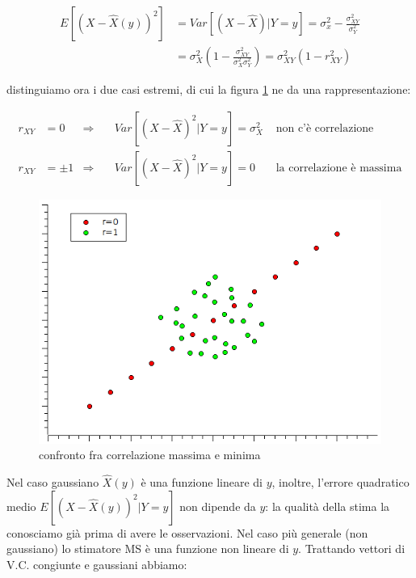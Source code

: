   \[ 
    \begin{split}
    E\left[(X-\hat{X}(y))^2\right] & =Var[(X-\hat{X})|Y=y]=\sigma_x^2-\frac{\sigma_{XY}^2}{\sigma_Y^2}\\
    & =\sigma_X^2(1-\frac{\sigma_{XY}^2}{\sigma_X^2\sigma_Y^2})=\sigma_{XY}^2(1-r_{XY}^2) 
    \end{split}
  \]
  
distinguiamo ora i due casi estremi, di cui la figura \ref{fig:confrontomaxminr} ne da una rappresentazione:

  \begin{align*}
    r_{XY}&=0    &\Rightarrow\quad &Var\left[(X-\hat{X})^2|Y=y\right]=\sigma_X^2  &\text{ non c'è correlazione} \\
    r_{XY}&=\pm1 &\Rightarrow\quad &Var\left[(X-\hat{X})^2|Y=y\right]=0  &\text{ la correlazione è massima}
  \end{align*}
  
  \begin{figure}[htbp]
    \centering
    \includegraphics[scale=0.5]{img/correlazione.png}
    \caption{confronto fra correlazione massima e minima\label{fig:confrontomaxminr}}
  \end{figure}
  
Nel caso gaussiano $\hat{X}(y)$ è una funzione lineare di $y$, inoltre, l'errore quadratico medio $E\left[(X-\hat{X}(y))^2|Y=y\right]$ non dipende da $y$: la qualità della stima la conosciamo già prima di avere le osservazioni.\newline
Nel caso più generale (non gaussiano) lo stimatore MS è una funzione non lineare di $y$. Trattando vettori di V.C. congiunte e gaussiani abbiamo:

